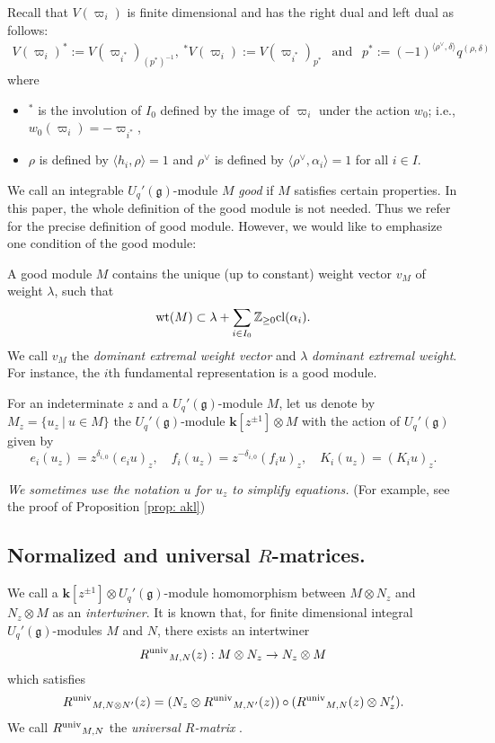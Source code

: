 \documentclass[11pt, leqno]{amsart}
\theoremstyle{definition}
\numberwithin{equation}{section}
\begin{document}
Recall that $V({\varpi}_i)$ is finite dimensional and has the right dual and left dual as follows:
\begin{align} \label{eq: dual}
V(\varpi_i)^*{\mathbin{:=}}  V(\varpi_{i^*})_{(p^*)^{-1}}, \ {}^*V(\varpi_i){\mathbin{:=}}  V(\varpi_{i^*})_{p^*} \ \  \text{ and } \ \
p^* {\mathbin{:=}} (-1)^{\langle \rho^\vee ,\delta \rangle}q^{(\rho,\delta)}
\end{align}
where
\begin{itemize}
\item $^*$ is the involution of $I_0$ defined by the image of ${\varpi}_i$ under the action $w_0$; i.e., $w_0({\varpi}_i)=-{\varpi}_{i^*}$,
\item $\rho$ is defined by  $\langle h_i,\rho \rangle=1$ and $\rho^\vee$ is defined by $\langle \rho^\vee,\alpha_i  \rangle=1$ for all $i \in I$.
\end{itemize}

\medskip

We call an integrable $U_q'({\mathfrak g})$-module $M$ {\it good} if  $M$
satisfies certain properties. In this paper, the whole definition of the good module is not needed. Thus we refer
\cite{Kas02} for the precise definition of good module. However, we
would like to emphasize one condition of the good module:

\smallskip

A good module $M$ contains the unique (up to constant) weight vector $v_M$ of weight $\lambda$, such that
$$   {\rm wt}(M) \subset \lambda + \sum_{i \in I_0} {\mathbb Z}_{\ge 0} {\mathrm{cl}}(\alpha_i).$$
We call $v_M$ the {\it dominant extremal weight vector} and $\lambda$ {\it dominant extremal weight}.
For instance, the $i$th fundamental representation
is a good module.

\medskip

For an indeterminate $z$
and a ${U_q'({\mathfrak g})}$-module $M$, let us denote by $M_z= \{ u_z \ | \ u \in M \}$
the ${U_q'({\mathfrak g})}$-module ${\mathbf{k}}[z^{\pm 1}]\otimes M$ with the action of ${U_q'({\mathfrak g})}$ given by
$$e_i(u_z)=z^{\delta_{i,0}}(e_iu)_z, \quad
f_i(u_z)=z^{-\delta_{i,0}}(f_iu)_z, \quad
K_i(u_z)=(K_iu)_z.
$$

{\it We sometimes use the notation $u$ for $u_z$ to simplify equations.} (For example, see the proof of Proposition \ref{prop: akl})

\subsection{ Normalized and universal $R$-matrices.}
We call a ${\mathbf{k}}[z^{\pm 1}] \otimes {U_q'({\mathfrak g})}$-module homomorphism between $M \otimes N_z$ and $N_z \otimes M$ as an {\it intertwiner}.
It is known that, for finite dimensional integral ${U_q'({\mathfrak g})}$-modules $M$ and $N$,
there exists an intertwiner
$${R^{\rm{univ}}}_{M,N}(z): M \otimes N_z \to N_z \otimes M$$
which satisfies
\begin{align}\label{eq: Runiv property}
{R^{\rm{univ}}}_{M,N\otimes N'}(z)=(N_z \otimes {R^{\rm{univ}}}_{M,N'}(z)) \circ ({R^{\rm{univ}}}_{M,N}(z)\otimes N'_z).
\end{align}
We call ${R^{\rm{univ}}}_{M,N}$ the {\it universal $R$-matrix} \cite{FR92}.
\end{document}
